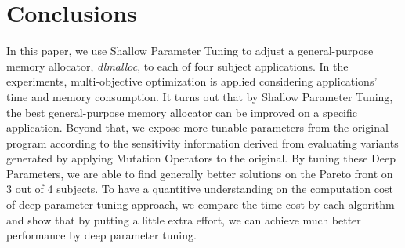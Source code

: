 \section{Conclusions}
In this paper, we use Shallow Parameter Tuning to adjust a general-purpose memory allocator, \emph{dlmalloc}, to each of four subject applications. In the experiments, multi-objective optimization is applied considering applications' time and memory consumption. It turns out that by Shallow Parameter Tuning, the best general-purpose memory allocator can be improved on a specific application. Beyond that, we expose more tunable parameters from the original program according to the sensitivity information derived from evaluating variants generated by applying Mutation Operators to the original. By tuning these Deep Parameters, we are able to find generally better solutions on the Pareto front on 3 out of 4 subjects. 
To have a quantitive understanding on the computation cost of deep parameter tuning approach, we compare the time cost by each algorithm and show that by putting a little extra effort, we can achieve much better performance by deep parameter tuning.

